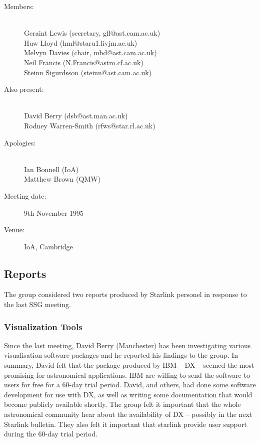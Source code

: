 \begin{description}
\item[Members:]\mbox{}\\
Geraint Lewis (secretary, gfl@ast.cam.ac.uk)\\
Huw Lloyd (hml@staru1.livjm.ac.uk)\\
Melvyn Davies (chair, mbd@ast.cam.ac.uk)\\
Neil Francis (N.Francis@astro.cf.ac.uk)\\
Steinn Sigurdsson (steinn@ast.cam.ac.uk)

\item[Also present:]\mbox{}\\
David Berry (dsb@ast.man.ac.uk)\\
Rodney Warren-Smith (rfws@star.rl.ac.uk)

\item[Apologies:]\mbox{}\\
Ian Bonnell (IoA)\\
Matthew Brown (QMW)

\item[Meeting date:]9th November 1995

\item[Venue:]IoA, Cambridge
\end{description}
 
\subsection{Reports}

The group considered two reports produced by Starlink personel in
response to the last SSG meeting.

\subsubsection{Visualization Tools}

Since the last meeting, David Berry (Manchester) has been
investigating various visualisation software packages and he reported
his findings to the group. In summary, David felt that the package
produced by IBM -- DX -- seemed the most promising for astronomical
applications. IBM are willing to send the software to users for free
for a 60-day trial period.  David, and others, had done some software
development for use with DX, as well as writing some documentation
that would become publicly available shortly. The group felt it
important that the whole astronomical community hear about the
availability of DX -- possibly in the next Starlink bulletin. They
also felt it important that starlink provide user support during the
60-day trial period.

